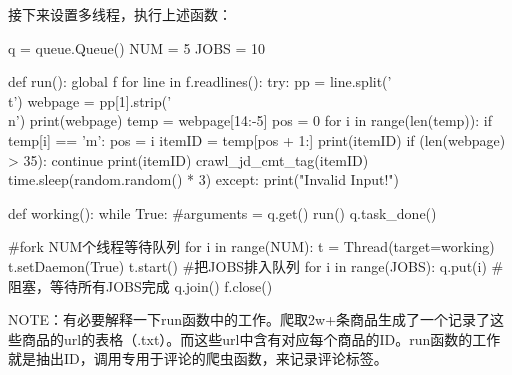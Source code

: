 接下来设置多线程，执行上述函数：
\begin{python}
q = queue.Queue()
NUM = 5
JOBS = 10

def run():
    global f
    for line in f.readlines():
        try:
            pp = line.split('\\t')
            webpage = pp[1].strip('\\n')
            print(webpage)
            temp = webpage[14:-5]
            pos = 0
            for i in range(len(temp)):
                if temp[i] == 'm':
                    pos = i
            itemID = temp[pos + 1:]
            print(itemID)
            if (len(webpage) > 35):
                continue
            print(itemID)
            crawl\_jd\_cmt\_tag(itemID)
            time.sleep(random.random() * 3)
        except:
            print("Invalid Input!")

def working():
    while True:
        #arguments = q.get()
        run()
        q.task\_done()


#fork NUM个线程等待队列
for i in range(NUM):
    t = Thread(target=working)
    t.setDaemon(True)
    t.start()
#把JOBS排入队列
for i in range(JOBS):
    q.put(i)
#阻塞，等待所有JOBS完成
q.join()
f.close()
\end{python}
NOTE：有必要解释一下run函数中的工作。爬取2w+条商品生成了一个记录了这些商品的url的表格（.txt）。而这些url中含有对应每个商品的ID。run函数的工作就是抽出ID，调用专用于评论的爬虫函数，来记录评论标签。

